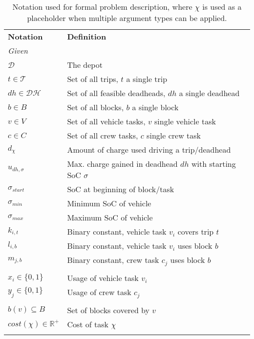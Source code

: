\documentclass[]{article}
\begin{document}
\begin{table}[h]
  \centering
  \begin{tabular}{ll}
    \toprule
    \multicolumn{1}{l}{\textbf{Notation}} & \multicolumn{1}{l}{\textbf{Definition}}               \\
    \cmidrule(lr){1-1}\cmidrule(lr){2-2}
    \multicolumn{2}{l}{\textit{Given}} \\
    $\mathcal{D}$ & The depot \\ 
    $t \in \mathcal{T}$ & Set of all trips, $t$ a single trip \\
    $dh \in \mathcal{DH}$ & Set of all feasible deadheads, $dh$ a single deadhead \\ 
    $b \in B$ & Set of all blocks, $b$ a single block \\
    $v \in V$ & Set of all vehicle tasks, $v$ single vehicle task \\
    $c \in C$ & Set of all crew tasks, $c$ single crew task \\
    $d_\chi$ & Amount of charge used driving a trip/deadhead \\
    $u_{dh,\sigma}$ & Max. charge gained in deadhead $dh$ with starting SoC $\sigma$ \\
    $\sigma_{start}$ & SoC at beginning of block/task \\
    $\sigma_{min}$ & Minimum SoC of vehicle \\
    $\sigma_{max}$ & Maximum SoC of vehicle \\ 
    $k_{i,t}$ & Binary constant, vehicle task $v_i$ covers trip $t$ \\ 
    $l_{i,b}$ & Binary constant, vehicle task $v_i$ uses block $b$ \\ 
    $m_{j,b}$ & Binary constant, crew task $c_j$ uses block $b$ \\ 
    \addlinespace[0.6em]
    \multicolumn{2}{l}{\textit{Decision variables}} \\
    $x_{i} \in \{ 0, 1 \}$ & Usage of vehicle task $v_i$  \\ 
    $y_{j} \in \{ 0, 1 \}$ & Usage of crew task $c_j$ \\ 
    \addlinespace[0.6em]
    \multicolumn{2}{l}{\textit{Helper functions}} \\
    $b(v) \subseteq B$ & Set of blocks covered by $v$ \\ 
    $cost(\chi) \in \mathbb{R}^+$ & Cost of task $\chi$ \\ 
    \addlinespace[0.2em]
    \bottomrule
  \end{tabular}
  \label{tab:notation}
  \caption{Notation used for formal problem description, where $\chi$ is used as a placeholder when multiple argument types can be applied.}
\end{table}
\end{document}
